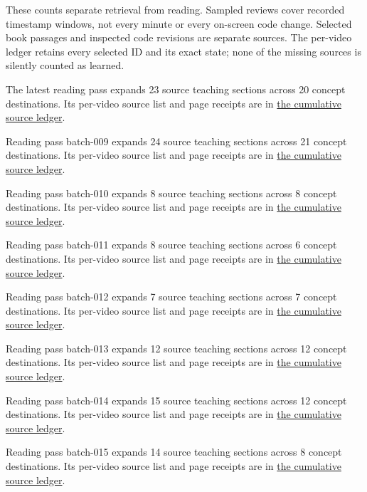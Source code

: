 These counts separate retrieval from reading. Sampled reviews cover recorded timestamp windows, not every minute or every on-screen code change. Selected book passages and inspected code revisions are separate sources. The per-video ledger retains every selected ID and its exact state; none of the missing sources is silently counted as learned.

The latest reading pass expands 23 source teaching sections across 20 concept destinations. Its per-video source list and page receipts are in \hyperref[appendix-877738f6f4d2-batch-008-expanded-reading-and-integration]{the cumulative source ledger}.

Reading pass batch-009 expands 24 source teaching sections across 21 concept destinations. Its per-video source list and page receipts are in \hyperref[appendix-877738f6f4d2-batch-009-expanded-reading-and-integration]{the cumulative source ledger}.

Reading pass batch-010 expands 8 source teaching sections across 8 concept destinations. Its per-video source list and page receipts are in \hyperref[appendix-877738f6f4d2-batch-010-expanded-reading-and-integration]{the cumulative source ledger}.

Reading pass batch-011 expands 8 source teaching sections across 6 concept destinations. Its per-video source list and page receipts are in \hyperref[appendix-877738f6f4d2-batch-011-expanded-reading-and-integration]{the cumulative source ledger}.

Reading pass batch-012 expands 7 source teaching sections across 7 concept destinations. Its per-video source list and page receipts are in \hyperref[appendix-877738f6f4d2-batch-012-expanded-reading-and-integration]{the cumulative source ledger}.

Reading pass batch-013 expands 12 source teaching sections across 12 concept destinations. Its per-video source list and page receipts are in \hyperref[appendix-877738f6f4d2-batch-013-expanded-reading-and-integration]{the cumulative source ledger}.

Reading pass batch-014 expands 15 source teaching sections across 12 concept destinations. Its per-video source list and page receipts are in \hyperref[appendix-877738f6f4d2-batch-014-expanded-reading-and-integration]{the cumulative source ledger}.

Reading pass batch-015 expands 14 source teaching sections across 8 concept destinations. Its per-video source list and page receipts are in \hyperref[appendix-877738f6f4d2-batch-015-expanded-reading-and-integration]{the cumulative source ledger}.

